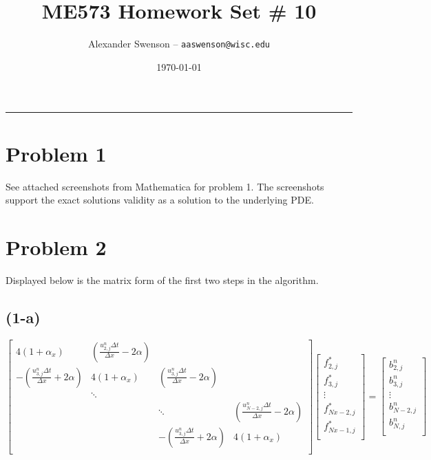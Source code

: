 \documentclass[12pt]{article}
\title{ME573 Homework Set \# 10}
\author{Alexander Swenson -- \texttt{aaswenson@wisc.edu}}
\date{\today}
\begin{document}
	
	\maketitle
	
	\vspace{-0.3in}
	\noindent
	\rule{\linewidth}{0.4pt}
	
	\noindent
	

\section{Problem 1}
	See attached screenshots from Mathematica for problem 1. The screenshots support the exact solutions validity as a solution to the underlying PDE.
\newpage
\section{Problem 2}
	
\noindent Displayed below is the matrix form of the first two steps in the algorithm.
\subsection{(1-a)}	
\[
\begin{bmatrix} 
4(1+\alpha_x) & (\frac{u_{2,j}^n\Delta t}{\Delta x} - 2\alpha)   &			   &\\
-(\frac{u_{3,j}^n\Delta t}{\Delta x} + 2\alpha) & 4(1+\alpha_x) & (\frac{u_{3,j}^n\Delta t}{\Delta x} - 2\alpha)  &\\
& \ddots &			   &\\
&	 	  & \ddots & (\frac{u_{N-2,j}^n\Delta t}{\Delta x} - 2\alpha)  \\
&		  & -(\frac{u_{3,j}^n\Delta t}{\Delta x} + 2\alpha) & 4(1+\alpha_x)  \\ 
\end{bmatrix}
\begin{bmatrix} 
f_{2,j}^{*}\\
f_{3,j}^{*}\\
\vdots\\
f_{Nx-2,j}^{*}\\
f_{Nx-1,j}^{*}\\ 
\end{bmatrix} = 
\begin{bmatrix} 
b_{2,j}^n\\
b_{3,j}^n\\
\vdots\\
b_{N-2,j}^n\\
b_{N,j}^n\\ 
\end{bmatrix}
\]
\end{document}
